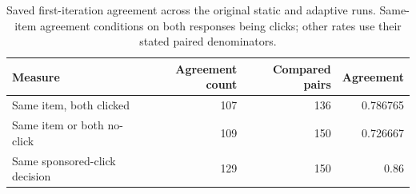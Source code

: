 \begin{table}[htbp!]
\centering
\small
\setlength{\tabcolsep}{3pt}
\renewcommand{\arraystretch}{1.1}
\begin{tabular}{lrrr}
\hline
Measure & Agreement count & Compared pairs & Agreement \\
\hline
Same item, both clicked & 107 & 136 & 0.786765 \\
Same item or both no-click & 109 & 150 & 0.726667 \\
Same sponsored-click decision & 129 & 150 & 0.86 \\
\hline
\end{tabular}
\caption{Saved first-iteration agreement across the original static and adaptive runs. Same-item agreement conditions on both responses being clicks; other rates use their stated paired denominators.}
\label{chap:results:tab:rq1_seed44_advertising_spike_agreement}
\end{table}
